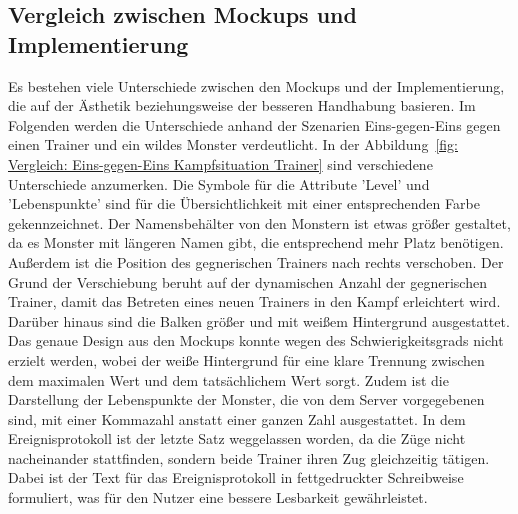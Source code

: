 \subsection{Vergleich zwischen Mockups und Implementierung}\label{subsec:vergleich-zwischen-mockups-und-implementierung-kampf-führen}
Es bestehen viele Unterschiede zwischen den Mockups und der Implementierung, die auf der Ästhetik beziehungsweise der besseren Handhabung basieren. Im Folgenden werden die Unterschiede anhand der Szenarien Eins-gegen-Eins gegen einen Trainer und ein wildes Monster verdeutlicht. In der Abbildung~\ref{fig: Vergleich: Eins-gegen-Eins Kampfsituation Trainer} sind verschiedene Unterschiede anzumerken. Die Symbole für die Attribute 'Level' und 'Lebenspunkte' sind für die Übersichtlichkeit mit einer entsprechenden Farbe gekennzeichnet.
Der Namensbehälter von den Monstern ist etwas größer gestaltet, da es Monster mit längeren Namen gibt, die entsprechend mehr Platz benötigen.
Außerdem ist die Position des gegnerischen Trainers nach rechts verschoben. Der Grund der Verschiebung beruht auf der dynamischen Anzahl der gegnerischen Trainer, damit das Betreten eines neuen Trainers in den Kampf erleichtert wird.
Darüber hinaus sind die Balken größer und mit weißem Hintergrund ausgestattet. Das genaue Design aus den Mockups konnte wegen des Schwierigkeitsgrads nicht erzielt werden, wobei der weiße Hintergrund für eine klare Trennung zwischen dem maximalen Wert und dem tatsächlichem Wert sorgt.
Zudem ist die Darstellung der Lebenspunkte der Monster, die von dem Server vorgegebenen sind, mit einer Kommazahl anstatt einer ganzen Zahl ausgestattet.
In dem Ereignisprotokoll ist der letzte Satz weggelassen worden, da die Züge nicht nacheinander stattfinden, sondern beide Trainer ihren Zug gleichzeitig tätigen. Dabei ist der Text für das Ereignisprotokoll in fettgedruckter Schreibweise formuliert, was für den Nutzer eine bessere Lesbarkeit gewährleistet.
